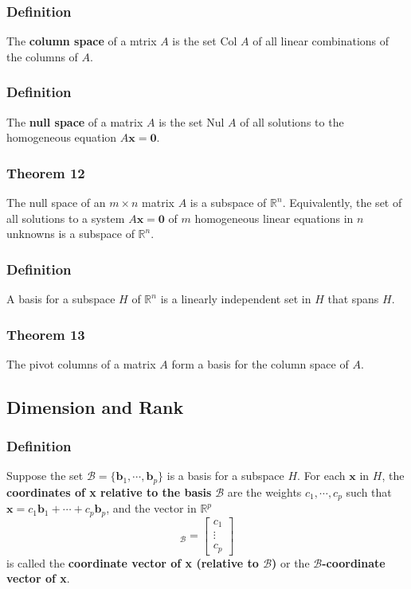 \documentclass[letterpaper,11pt]{article}
\begin{document}
			\subsubsection{Definition}
				The \textbf{column space} of a mtrix $A$ is the set Col $A$ of all linear combinations of the columns of $A$.
			\subsubsection{Definition}
				The \textbf{null space} of a matrix $A$ is the set Nul $A$ of all solutions to the homogeneous equation $A\mathbf{x}=\mathbf{0}$.
			\subsubsection{Theorem 12}
				The null space of an $m\times n$ matrix $A$ is a subspace of $\mathbb{R}^n$. Equivalently, the set of all solutions to a system $A\mathbf{x}=\mathbf{0}$ of $m$ homogeneous linear equations in $n$ unknowns is a subspace of  $\mathbb{R}^n$.
			\subsubsection{Definition}
				A basis for a subspace $H$ of $\mathbb{R}^n$ is a linearly independent set in $H$ that spans $H$.
			\subsubsection{Theorem 13}
				The pivot columns of a matrix $A$ form a basis for the column space of $A$.
		\subsection{Dimension and Rank}
			\subsubsection{Definition}
				Suppose the set $\mathcal{B}=\{\mathbf{b}_1,\cdots,\mathbf{b}_p\}$ is a basis for a subspace $H$. For each $\mathbf{x}$ in $H$, the \textbf{coordinates of x relative to the basis} $\mathcal{B}$ are the weights $c_1,\cdots,c_p$ such that $\mathbf{x}=c_1\mathbf{b}_1+\cdots+c_p\mathbf{b}_p$, and the vector in $\mathbb{R}^p$
				\begin{equation}
					[\mathbf{x}]_{\mathcal{B}}=
					\begin{bmatrix}
						c_1 \\ \vdots \\ c_p
					\end{bmatrix}
				\end{equation}
				is called the \textbf{coordinate vector of x (relative to $\mathcal{B}$)} or the \textbf{$\mathcal{B}$-coordinate vector of x}.
\end{document}
